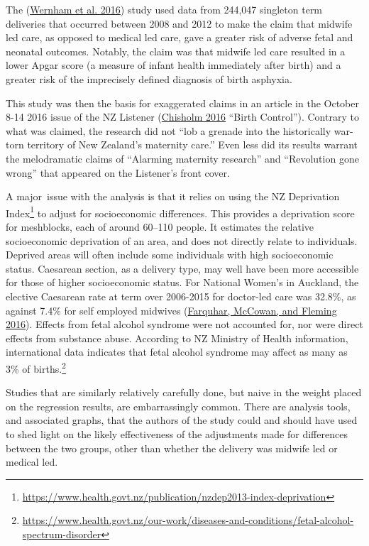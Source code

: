 \documentclass[
  10pt,
  b5paper]{book}
\begin{document}
The (\protect\hyperlink{ref-wernham_EtAl_2016}{Wernham et al. 2016}) study used data from 244,047 singleton
term deliveries that occurred between 2008 and 2012 to make the
claim that midwife led care, as opposed to medical led care, gave a
greater risk of adverse fetal and neonatal outcomes. Notably, the
claim was that midwife led care resulted in a lower Apgar score
(a measure of infant health immediately after birth) and a greater
risk of the imprecisely defined diagnosis of birth asphyxia.

This study was then the basis for exaggerated claims in an article
in the October 8-14 2016 issue of the NZ Listener
(\protect\hyperlink{ref-chisholm_2016}{Chisholm 2016} {``Birth Control''}). Contrary to what was
claimed, the research did not
``lob a grenade into the historically war-torn territory of
New Zealand's maternity care.''
Even less did its results warrant the melodramatic claims of
``Alarming maternity research'' and ``Revolution gone wrong'' that
appeared on the Listener's front cover.

A major~issue with the analysis is that it relies on using the NZ
Deprivation Index\footnote{
  \url{https://www.health.govt.nz/publication/nzdep2013-index-deprivation}}
to adjust for socioeconomic differences. This provides a deprivation
score for meshblocks, each of around 60--110 people. It estimates the
relative socioeconomic deprivation of an area, and does not directly
relate to individuals. Deprived areas will often include some
individuals with high socioeconomic status. Caesarean section, as a
delivery type, may well have been more accessible for those of
higher socioeconomic status. For National Women's in Auckland,
the elective Caesarean rate at term over 2006-2015 for doctor-led
care was 32.8\%, as against 7.4\% for self employed midwives
(\protect\hyperlink{ref-farquhar2016letter}{Farquhar, McCowan, and Fleming 2016}). Effects from fetal alcohol syndrome were
not accounted for, nor were direct effects from substance abuse.
According to NZ Ministry of Health information, international data
indicates that fetal alcohol syndrome may affect as many as 3\% of
births.\footnote{\url{https://www.health.govt.nz/our-work/diseases-and-conditions/fetal-alcohol-spectrum-disorder}}

Studies that are similarly relatively carefully done,
but naive in the weight placed on the regression results,
are embarrassingly common. There are analysis tools, and
associated graphs, that the authors of the study could
and should have used to shed light on the likely
effectiveness of the adjustments made for differences
between the two groups, other than whether the delivery
was midwife led or medical led.
\end{document}
